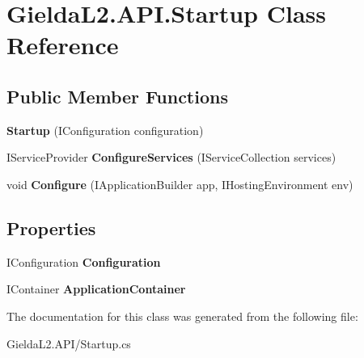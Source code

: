 \hypertarget{class_gielda_l2_1_1_a_p_i_1_1_startup}{}\section{Gielda\+L2.\+A\+P\+I.\+Startup Class Reference}
\label{class_gielda_l2_1_1_a_p_i_1_1_startup}
\subsection*{Public Member Functions}
\begin{DoxyCompactItemize}
\item 
\mbox{\label{class_gielda_l2_1_1_a_p_i_1_1_startup_aec176eb71fe537e5ee5a4ab052b2465e}} 
{\bfseries Startup} (I\+Configuration configuration)
\item 
\mbox{\label{class_gielda_l2_1_1_a_p_i_1_1_startup_ae53b8374d5cc15f6688aeb349bbb5e91}} 
I\+Service\+Provider {\bfseries Configure\+Services} (I\+Service\+Collection services)
\item 
\mbox{\label{class_gielda_l2_1_1_a_p_i_1_1_startup_a156f302642950a55e97dc96595523b56}} 
void {\bfseries Configure} (I\+Application\+Builder app, I\+Hosting\+Environment env)
\end{DoxyCompactItemize}
\subsection*{Properties}
\begin{DoxyCompactItemize}
\item 
\mbox{\label{class_gielda_l2_1_1_a_p_i_1_1_startup_a33f1a7cb4f6c4af44839ba8a3e2282a5}} 
I\+Configuration {\bfseries Configuration}
\item 
\mbox{\label{class_gielda_l2_1_1_a_p_i_1_1_startup_ad67055b415aa977d121b2a576b4956ef}} 
I\+Container {\bfseries Application\+Container}
\end{DoxyCompactItemize}


The documentation for this class was generated from the following file\+:\begin{DoxyCompactItemize}
\item 
Gielda\+L2.\+A\+P\+I/Startup.\+cs\end{DoxyCompactItemize}
